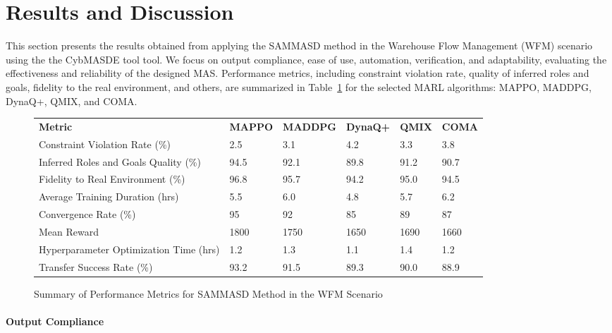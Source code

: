 \documentclass[sigconf,anonymous]{aamas}
\begin{document}
\section{Results and Discussion}
\label{sec:results_discussion}

This section presents the results obtained from applying the SAMMASD method in the Warehouse Flow Management (WFM) scenario using the the CybMASDE tool tool. We focus on output compliance, ease of use, automation, verification, and adaptability, evaluating the effectiveness and reliability of the designed MAS. Performance metrics, including constraint violation rate, quality of inferred roles and goals, fidelity to the real environment, and others, are summarized in Table~\ref{fig:performance_metrics} for the selected MARL algorithms: MAPPO, MADDPG, DynaQ+, QMIX, and COMA.

\begin{figure}[h!]
    \centering
    \caption{Summary of Performance Metrics for SAMMASD Method in the WFM Scenario}
    \small
    \renewcommand{\arraystretch}{1.1}
    \begin{tabular}{p{1.9cm}p{0.9cm}p{1.1cm}p{1cm}p{0.7cm}p{0.7cm}}
        \hline
        \textbf{Metric} & \textbf{MAPPO} & \textbf{MADDPG} & \textbf{DynaQ+} & \textbf{QMIX} & \textbf{COMA} \\
        Constraint Violation Rate (\%) & 2.5 & 3.1 & 4.2 & 3.3 & 3.8 \\
        Inferred Roles and Goals Quality (\%) & 94.5 & 92.1 & 89.8 & 91.2 & 90.7 \\
        Fidelity to Real Environment (\%) & 96.8 & 95.7 & 94.2 & 95.0 & 94.5 \\
        Average Training Duration (hrs) & 5.5 & 6.0 & 4.8 & 5.7 & 6.2 \\
        Convergence Rate (\%) & 95 & 92 & 85 & 89 & 87 \\
        Mean Reward & 1800 & 1750 & 1650 & 1690 & 1660 \\
        Hyperparameter Optimization Time (hrs) & 1.2 & 1.3 & 1.1 & 1.4 & 1.2 \\
        Transfer Success Rate (\%) & 93.2 & 91.5 & 89.3 & 90.0 & 88.9 \\
        \hline
    \end{tabular}
    \label{fig:performance_metrics}
\end{figure}

\paragraph{Output Compliance}
\end{document}
